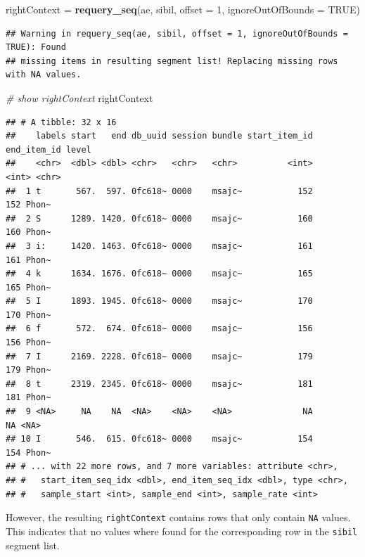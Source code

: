 \documentclass[]{book}
\newenvironment{Shaded}{\begin{snugshade}}{\end{snugshade}}
\newcommand{\CommentTok}[1]{\textcolor[rgb]{0.56,0.35,0.01}{\textit{#1}}}
\newcommand{\DataTypeTok}[1]{\textcolor[rgb]{0.13,0.29,0.53}{#1}}
\newcommand{\DecValTok}[1]{\textcolor[rgb]{0.00,0.00,0.81}{#1}}
\newcommand{\KeywordTok}[1]{\textcolor[rgb]{0.13,0.29,0.53}{\textbf{#1}}}
\newcommand{\NormalTok}[1]{#1}
\newcommand{\OtherTok}[1]{\textcolor[rgb]{0.56,0.35,0.01}{#1}}
\newcommand{\StringTok}[1]{\textcolor[rgb]{0.31,0.60,0.02}{#1}}
\begin{document}
\begin{Shaded}
\begin{Highlighting}[]
\NormalTok{rightContext =}\StringTok{ }\KeywordTok{requery_seq}\NormalTok{(ae, sibil,}
                           \DataTypeTok{offset =} \DecValTok{1}\NormalTok{,}
                           \DataTypeTok{ignoreOutOfBounds =} \OtherTok{TRUE}\NormalTok{)}
\end{Highlighting}
\end{Shaded}

\begin{verbatim}
## Warning in requery_seq(ae, sibil, offset = 1, ignoreOutOfBounds = TRUE): Found
## missing items in resulting segment list! Replacing missing rows with NA values.
\end{verbatim}

\begin{Shaded}
\begin{Highlighting}[]
\CommentTok{# show rightContext}
\NormalTok{rightContext}
\end{Highlighting}
\end{Shaded}

\begin{verbatim}
## # A tibble: 32 x 16
##    labels start   end db_uuid session bundle start_item_id end_item_id level
##    <chr>  <dbl> <dbl> <chr>   <chr>   <chr>          <int>       <int> <chr>
##  1 t       567.  597. 0fc618~ 0000    msajc~           152         152 Phon~
##  2 S      1289. 1420. 0fc618~ 0000    msajc~           160         160 Phon~
##  3 i:     1420. 1463. 0fc618~ 0000    msajc~           161         161 Phon~
##  4 k      1634. 1676. 0fc618~ 0000    msajc~           165         165 Phon~
##  5 I      1893. 1945. 0fc618~ 0000    msajc~           170         170 Phon~
##  6 f       572.  674. 0fc618~ 0000    msajc~           156         156 Phon~
##  7 I      2169. 2228. 0fc618~ 0000    msajc~           179         179 Phon~
##  8 t      2319. 2345. 0fc618~ 0000    msajc~           181         181 Phon~
##  9 <NA>     NA    NA  <NA>    <NA>    <NA>              NA          NA <NA> 
## 10 I       546.  615. 0fc618~ 0000    msajc~           154         154 Phon~
## # ... with 22 more rows, and 7 more variables: attribute <chr>,
## #   start_item_seq_idx <dbl>, end_item_seq_idx <dbl>, type <chr>,
## #   sample_start <int>, sample_end <int>, sample_rate <int>
\end{verbatim}

However, the resulting \texttt{rightContext} contains rows that only contain \texttt{NA} values. This indicates that no values where found for the corresponding row in the \texttt{sibil} segment list.
\end{document}
